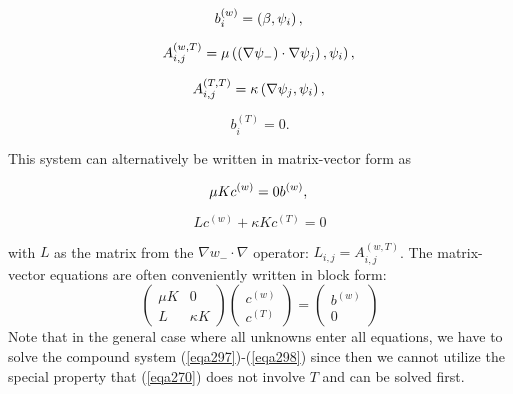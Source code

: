 \documentclass[../main.tex]{subfiles}
\begin{document}
		\begin{equation}
			\label{eqa282}
			b_{i}^{(w)} =\left(\beta, \psi_{i}\right), \\
		\end{equation}

		\begin{equation}
			\label{eqa283}	
			A_{i, j}^{(w, T)} \left.=\mu\left(\left(\nabla \psi_{-}\right) \cdot \nabla \psi_{j}\right), \psi_{i}\right), \\
		\end{equation}
	
		\begin{equation}
			\label{eqa284}
			A_{i, j}^{(T, T)}=\kappa\left(\nabla \psi_{j}, \psi_{i}\right), \\
		\end{equation}
	
		\begin{equation}
			\label{eqa285}
			b_{i}^{(T)}=0 .
		\end{equation}
		
		\noindent This system can alternatively be written in matrix-vector form as
		
		\begin{equation}
			\label{eqa286}
			\mu K c^{(w)}=0 b^{(w)}, \\
		\end{equation}

		\begin{equation}
			\label{eqa287}
			L c^{(w)}+\kappa K c^{(T)}=0
		\end{equation}
	
		\noindent with $L$ as the matrix from the $\nabla w_{-} \cdot \nabla$ operator: $L_{i, j}=A_{i, j}^{(w, T)}$.\smallbreak
		The matrix-vector equations are often conveniently written in block form:
		$$
		\left(\begin{array}{cc}
			\mu K & 0 \\
			L & \kappa K
		\end{array}\right)\left(\begin{array}{c}
			c^{(w)} \\
			c^{(T)}
		\end{array}\right)=\left(\begin{array}{c}
			b^{(w)} \\
			0
		\end{array}\right)
		$$\smallbreak
		Note that in the general case where all unknowns enter all equations, we have to solve the compound system (\ref{eqa297})-(\ref{eqa298}) since then we cannot utilize the special property that (\ref{eqa270}) does not involve $T$ and can be solved first.
		
\end{document}
